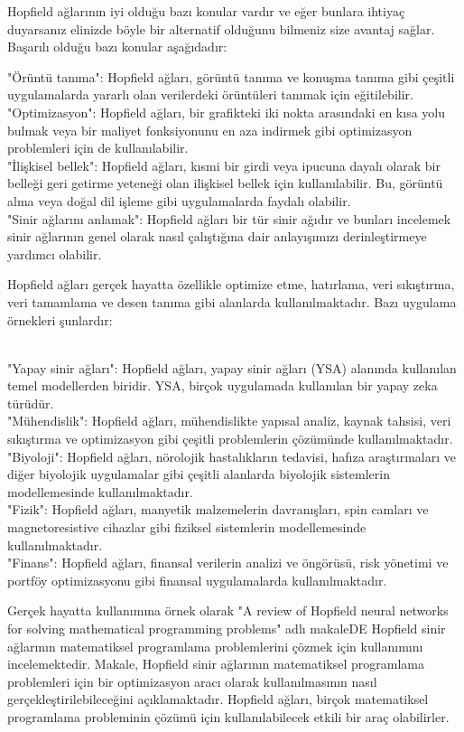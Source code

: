 \documentclass[11pt]{article}
\begin{document}
Hopfield ağlarının iyi olduğu bazı konular vardır ve eğer bunlara ihtiyaç duyarsanız elinizde böyle bir alternatif olduğunu bilmeniz size avantaj sağlar. Başarılı olduğu bazı konular aşağıdadır:

"Örüntü tanıma": Hopfield ağları, görüntü tanıma ve konuşma tanıma gibi çeşitli uygulamalarda yararlı olan verilerdeki örüntüleri tanımak için eğitilebilir.
\\"Optimizasyon": Hopfield ağları, bir grafikteki iki nokta arasındaki en kısa yolu bulmak veya bir maliyet fonksiyonunu en aza indirmek gibi optimizasyon problemleri için de kullanılabilir.
\\"İlişkisel bellek": Hopfield ağları, kısmi bir girdi veya ipucuna dayalı olarak bir belleği geri getirme yeteneği olan ilişkisel bellek için kullanılabilir. Bu, görüntü alma veya doğal dil işleme gibi uygulamalarda faydalı olabilir.
\\"Sinir ağlarını anlamak": Hopfield ağları bir tür sinir ağıdır ve bunları incelemek sinir ağlarının genel olarak nasıl çalıştığına dair anlayışımızı derinleştirmeye yardımcı olabilir.

Hopfield ağları gerçek hayatta özellikle optimize etme, hatırlama, veri sıkıştırma, veri tamamlama ve desen tanıma gibi alanlarda kullanılmaktadır. Bazı uygulama örnekleri şunlardır:

\\"Yapay sinir ağları": Hopfield ağları, yapay sinir ağları (YSA) alanında kullanılan temel modellerden biridir. YSA, birçok uygulamada kullanılan bir yapay zeka türüdür.
\\"Mühendislik": Hopfield ağları, mühendislikte yapısal analiz, kaynak tahsisi, veri sıkıştırma ve optimizasyon gibi çeşitli problemlerin çözümünde kullanılmaktadır.
\\"Biyoloji": Hopfield ağları, nörolojik hastalıkların tedavisi, hafıza araştırmaları ve diğer biyolojik uygulamalar gibi çeşitli alanlarda biyolojik sistemlerin modellemesinde kullanılmaktadır.
\\"Fizik": Hopfield ağları, manyetik malzemelerin davranışları, spin camları ve magnetoresistive cihazlar gibi fiziksel sistemlerin modellemesinde kullanılmaktadır.
\\"Finans": Hopfield ağları, finansal verilerin analizi ve öngörüsü, risk yönetimi ve portföy optimizasyonu gibi finansal uygulamalarda kullanılmaktadır.

Gerçek hayatta kullanımına örnek olarak "A review of Hopfield neural networks for solving mathematical programming problems" adlı makaleDE Hopfield sinir ağlarının matematiksel programlama problemlerini çözmek için kullanımını incelemektedir. Makale, Hopfield sinir ağlarının matematiksel programlama problemleri için bir optimizasyon aracı olarak kullanılmasının nasıl gerçekleştirilebileceğini açıklamaktadır.
Hopfield ağları, birçok matematiksel programlama probleminin çözümü için kullanılabilecek etkili bir araç olabilirler.
\end{document}
